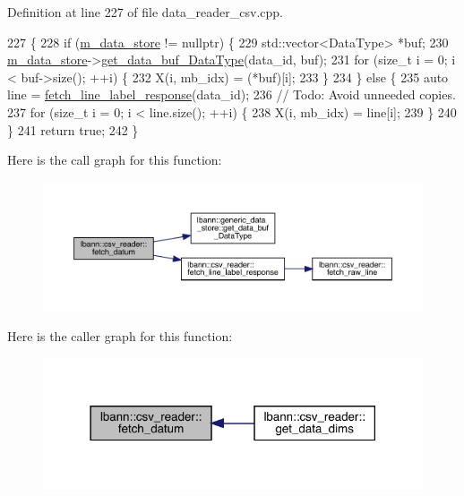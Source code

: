 Definition at line 227 of file data\+\_\+reader\+\_\+csv.\+cpp.


\begin{DoxyCode}
227                                                                      \{
228   \textcolor{keywordflow}{if} (\hyperlink{classlbann_1_1generic__data__reader_aefc076b842933a882214f4f709ca49c9}{m\_data\_store} != \textcolor{keyword}{nullptr}) \{
229     std::vector<DataType> *buf;
230     \hyperlink{classlbann_1_1generic__data__reader_aefc076b842933a882214f4f709ca49c9}{m\_data\_store}->\hyperlink{classlbann_1_1generic__data__store_ab3f8b7fe6d6631059d92714d4277a983}{get\_data\_buf\_DataType}(data\_id, buf);
231     \textcolor{keywordflow}{for} (\textcolor{keywordtype}{size\_t} i = 0; i < buf->size(); ++i) \{
232       X(i, mb\_idx) = (*buf)[i];
233     \}
234   \} \textcolor{keywordflow}{else} \{
235     \textcolor{keyword}{auto} line = \hyperlink{classlbann_1_1csv__reader_ae00ba61c2b9db1595ff62ab61a218cfb}{fetch\_line\_label\_response}(data\_id);
236     \textcolor{comment}{// Todo: Avoid unneeded copies.}
237     \textcolor{keywordflow}{for} (\textcolor{keywordtype}{size\_t} i = 0; i < line.size(); ++i) \{
238       X(i, mb\_idx) = line[i];
239     \}
240   \}
241   \textcolor{keywordflow}{return} \textcolor{keyword}{true};
242 \}
\end{DoxyCode}
Here is the call graph for this function\+:\nopagebreak
\begin{figure}[H]
\begin{center}
\leavevmode
\includegraphics[width=350pt]{classlbann_1_1csv__reader_a1fbac4ff1c24ec7f41f55fc8a43515c6_cgraph}
\end{center}
\end{figure}
Here is the caller graph for this function\+:\nopagebreak
\begin{figure}[H]
\begin{center}
\leavevmode
\includegraphics[width=318pt]{classlbann_1_1csv__reader_a1fbac4ff1c24ec7f41f55fc8a43515c6_icgraph}
\end{center}
\end{figure}
\mbox{\label{classlbann_1_1csv__reader_a0c223375a08ed0b6a3a1fcc03c86c4ac}} 
